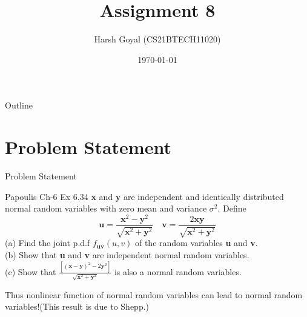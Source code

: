 \documentclass{beamer}
\title{Assignment 8}
\author{Harsh Goyal (CS21BTECH11020)}
\date{\today}
\begin{document}
\begin{frame}
    \titlepage 
\end{frame}

\logo{}

\let\vec\textbf
\begin{frame}{Outline}
    \tableofcontents
\end{frame}


\section{Problem Statement}
\begin{frame}{Problem Statement}
    \begin{block}{Papoulis Ch-6 Ex 6.34}
    \vec{x} and \vec{y} are independent and identically distributed normal random variables with zero mean and variance $\sigma^2$. Define
    \begin{equation}
        \vec{u}=\frac{\vec{x}^2-\vec{y}^2}{\sqrt{\vec{x}^2+\vec{y}^2}}             \hspace{12pt}            \vec{v} = \frac{2\vec{x}\vec{y}}{\sqrt{\vec{x}^2+\vec{y}^2}}
    \end{equation}
    (a) Find the joint p.d.f $f_{\vec{u}\vec{v}}(u,v)$ of the random variables \vec{u} and \vec{v}.\\
    (b) Show that \vec{u} and \vec{v} are independent normal random variables.\\
    (c) Show that $\frac{[(\vec{x}-\vec{y})^2-2\vec{y}^2]}{\sqrt{\vec{x}^2+\vec{y}^2}}$ is also a normal random variables.\\

    \bigskip

    Thus nonlinear function of normal random variables can lead to normal random variables!(This result is due to Shepp.)
    \end{block}
\end{frame}


\end{document}
